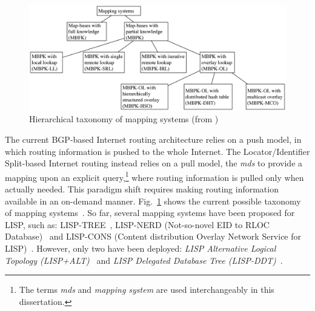 \begin{figure}[!t]
	\centering
	\includegraphics[width=\textwidth]{Pics/Hierarchical_taxonomy_of_mapping_systems.eps}
	\caption{Hierarchical taxonomy of mapping systems (from \cite{info3-articles-2013-06})}
	\label{Hierarchical_taxonomy_of_mapping_systems}
\end{figure}
The current BGP-based Internet routing architecture relies on a push model, in which routing information is pushed to the whole Internet. The Locator/Identifier Split-based Internet routing instead relies on a pull model, the \emph{\acrfull{mds}} to provide a mapping upon an explicit query,\footnote{The terms \emph{\acrfull{mds}} and \emph{mapping system} are used interchangeably in this dissertation.}  where routing information is pulled only when actually needed. This paradigm shift requires making routing information available in an on-demand manner. %
Fig.~\ref{Hierarchical_taxonomy_of_mapping_systems} shows the current possible taxonomy of mapping systems~\cite{info3-articles-2013-06}. So far, several mapping systems have been proposed for LISP, such as: LISP-TREE~\cite{lispTree}, LISP-NERD (Not-so-novel EID to RLOC Database)~\cite{lear2013nerd} and LISP-CONS (Content distribution Overlay Network Service for LISP)~\cite{brim2008lisp}. However, only two have been deployed: \emph{LISP Alternative Logical Topology (LISP+ALT)}~\cite{rfc6836} and \emph{LISP Delegated Database Tree (LISP-DDT)}~\cite{lispDDT}.


